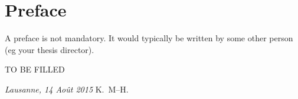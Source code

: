\chapter*{Preface}
A preface is not mandatory. It would typically be written by some other person (eg your thesis director).

TO BE FILLED

\bigskip
 
\noindent\textit{Lausanne, 14 Ao\^{u}t 2015}
\hfill K.~M--H.
